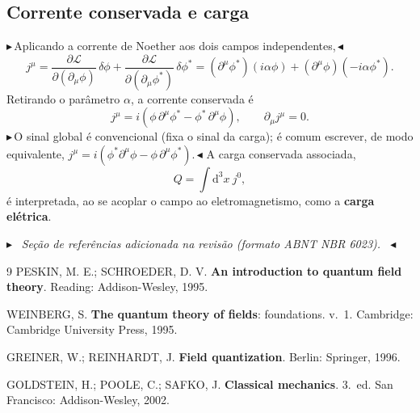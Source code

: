 \documentclass[12pt,a4paper]{article}
\newcommand{\rev}[1]{{\color{revred}\ensuremath{\blacktriangleright}\,#1\,\ensuremath{\blacktriangleleft}}}
\newenvironment{revbox}%
  {\par\medskip\noindent\color{revred}\ensuremath{\blacktriangleright}\ \itshape}%
  {\ \upshape\ensuremath{\blacktriangleleft}\par\medskip}
\newcommand{\dd}{\mathrm{d}}
\newcommand{\pt}[1]{\partial_{#1}}
\newcommand{\Lag}{\mathcal{L}}
\renewcommand{\d}{\partial}
\begin{document}
\subsection{Corrente conservada e carga}

\rev{Aplicando a corrente de Noether aos dois campos independentes,}
\begin{equation}
  j^{\mu}
  =\frac{\d\Lag}{\d(\pt{\mu}\phi)}\,\delta\phi
   +\frac{\d\Lag}{\d(\pt{\mu}\phi^{*})}\,\delta\phi^{*}
  =(\d^{\mu}\phi^{*})(i\alpha\phi)+(\d^{\mu}\phi)(-i\alpha\phi^{*}).
\end{equation}
Retirando o parâmetro $\alpha$, a corrente conservada é
\begin{equation}
  \boxed{\,j^{\mu}=i\!\left(\phi\,\d^{\mu}\phi^{*}-\phi^{*}\,\d^{\mu}\phi\right),
  \qquad \pt{\mu}j^{\mu}=0.\,}
\end{equation}
\rev{O sinal global é convencional (fixa o sinal da carga); é comum
escrever, de modo equivalente, $j^{\mu}=i(\phi^{*}\d^{\mu}\phi-\phi\,\d^{\mu}\phi^{*})$.}
A carga conservada associada,
\begin{equation}
  Q=\int\dd^{3}x\ j^{0},
\end{equation}
é interpretada, ao se acoplar o campo ao eletromagnetismo, como a
\textbf{carga elétrica}.

\begin{revbox}
Seção de referências adicionada na revisão (formato ABNT NBR 6023).
\end{revbox}
\begin{thebibliography}{9}
  PESKIN, M. E.; SCHROEDER, D. V.
  \textbf{An introduction to quantum field theory}.
  Reading: Addison-Wesley, 1995.

  WEINBERG, S.
  \textbf{The quantum theory of fields}: foundations. v.~1.
  Cambridge: Cambridge University Press, 1995.

  GREINER, W.; REINHARDT, J.
  \textbf{Field quantization}.
  Berlin: Springer, 1996.

  GOLDSTEIN, H.; POOLE, C.; SAFKO, J.
  \textbf{Classical mechanics}. 3.~ed.
  San Francisco: Addison-Wesley, 2002.
\end{thebibliography}
\end{document}
